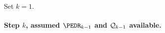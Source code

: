 \begin{mylist}
\item Set \( k=1 \).
\end{mylist}


\paragraph{Step \( k \), assumed \( \PEDR_{k-1} \) and \( \mathcal{Q}_{k-1} \) available.}


